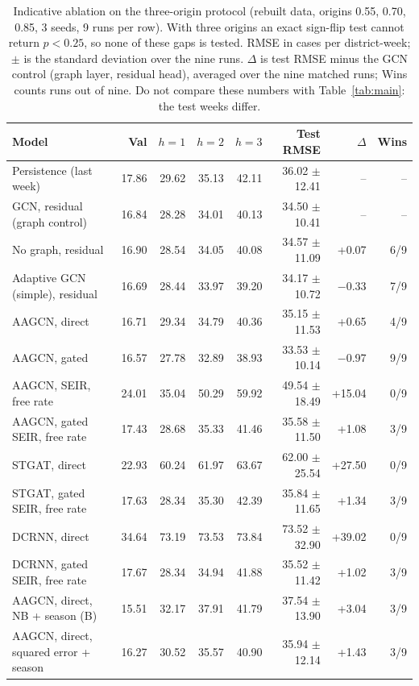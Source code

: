 \begin{table}[t]
\centering
\caption{Indicative ablation on the three-origin protocol (rebuilt data, origins 0.55, 0.70, 0.85, 3 seeds, 9 runs per row). With three origins an exact sign-flip test cannot return $p<0.25$, so none of these gaps is tested. RMSE in cases per district-week; $\pm$ is the standard deviation over the nine runs. $\Delta$ is test RMSE minus the GCN control (graph layer, residual head), averaged over the nine matched runs; Wins counts runs out of nine. Do not compare these numbers with Table~\ref{tab:main}: the test weeks differ.}
\label{tab:p3}
\footnotesize
\setlength{\tabcolsep}{4pt}
\begin{tabular}{@{}lrrrrrrr@{}}
\toprule
Model & Val & $h{=}1$ & $h{=}2$ & $h{=}3$ & Test RMSE & $\Delta$ & Wins \\
\midrule
Persistence (last week) & 17.86 & 29.62 & 35.13 & 42.11 & 36.02 $\pm$ 12.41 & -- & -- \\ %
\midrule
GCN, residual (graph control) & 16.84 & 28.28 & 34.01 & 40.13 & 34.50 $\pm$ 10.41 & -- & -- \\ %
No graph, residual & 16.90 & 28.54 & 34.05 & 40.08 & 34.57 $\pm$ 11.09 & +0.07 & 6/9 \\ %
Adaptive GCN (simple), residual & 16.69 & 28.44 & 33.97 & 39.20 & 34.17 $\pm$ 10.72 & $-$0.33 & 7/9 \\ %
\midrule
AAGCN, direct & 16.71 & 29.34 & 34.79 & 40.36 & 35.15 $\pm$ 11.53 & +0.65 & 4/9 \\ %
AAGCN, gated & 16.57 & 27.78 & 32.89 & 38.93 & 33.53 $\pm$ 10.14 & $-$0.97 & 9/9 \\ %
AAGCN, SEIR, free rate & 24.01 & 35.04 & 50.29 & 59.92 & 49.54 $\pm$ 18.49 & +15.04 & 0/9 \\ %
AAGCN, gated SEIR, free rate & 17.43 & 28.68 & 35.33 & 41.46 & 35.58 $\pm$ 11.50 & +1.08 & 3/9 \\ %
STGAT, direct & 22.93 & 60.24 & 61.97 & 63.67 & 62.00 $\pm$ 25.54 & +27.50 & 0/9 \\ %
STGAT, gated SEIR, free rate & 17.63 & 28.34 & 35.30 & 42.39 & 35.84 $\pm$ 11.65 & +1.34 & 3/9 \\ %
DCRNN, direct & 34.64 & 73.19 & 73.53 & 73.84 & 73.52 $\pm$ 32.90 & +39.02 & 0/9 \\ %
DCRNN, gated SEIR, free rate & 17.67 & 28.34 & 34.94 & 41.88 & 35.52 $\pm$ 11.42 & +1.02 & 3/9 \\ %
AAGCN, direct, NB + season (B) & 15.51 & 32.17 & 37.91 & 41.79 & 37.54 $\pm$ 13.90 & +3.04 & 3/9 \\ %
AAGCN, direct, squared error + season & 16.27 & 30.52 & 35.57 & 40.90 & 35.94 $\pm$ 12.14 & +1.43 & 3/9 \\ %
\bottomrule
\end{tabular}
\end{table}
